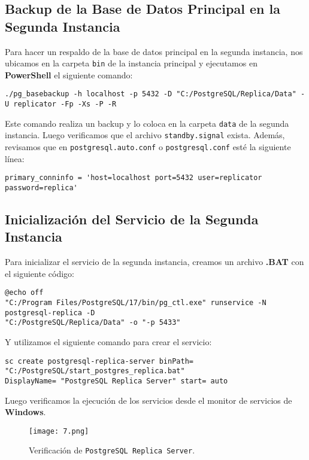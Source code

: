 \documentclass{article}
\begin{document}
\newpage
\subsection{Backup de la Base de Datos Principal en la Segunda Instancia}

Para hacer un respaldo de la base de datos principal en la segunda instancia, nos ubicamos en la carpeta \texttt{bin} de la instancia principal y ejecutamos en \textbf{PowerShell} el siguiente comando:

\begin{verbatim}
./pg_basebackup -h localhost -p 5432 -D "C:/PostgreSQL/Replica/Data" -U replicator -Fp -Xs -P -R
\end{verbatim}

Este comando realiza un backup y lo coloca en la carpeta \texttt{data} de la segunda instancia. Luego verificamos que el archivo \texttt{standby.signal} exista. Además, revisamos que en \texttt{postgresql.auto.conf} o \texttt{postgresql.conf} esté la siguiente línea:

\begin{verbatim}
primary_conninfo = 'host=localhost port=5432 user=replicator password=replica'
\end{verbatim}

\subsection{Inicialización del Servicio de la Segunda Instancia}

Para inicializar el servicio de la segunda instancia, creamos un archivo \textbf{.BAT} con el siguiente código:

\begin{verbatim}
@echo off
"C:/Program Files/PostgreSQL/17/bin/pg_ctl.exe" runservice -N postgresql-replica -D  
"C:/PostgreSQL/Replica/Data" -o "-p 5433"
\end{verbatim}

Y utilizamos el siguiente comando para crear el servicio:

\begin{verbatim}
sc create postgresql-replica-server binPath= "C:/PostgreSQL/start_postgres_replica.bat" 
DisplayName= "PostgreSQL Replica Server" start= auto
\end{verbatim}

Luego verificamos la ejecución de los servicios desde el monitor de servicios de \textbf{Windows}.

\begin{figure}[h]
    \centering
    \texttt{[image: 7.png]}
    \caption{Verificación de \texttt{PostgreSQL Replica Server}.}
\end{figure}
\end{document}
